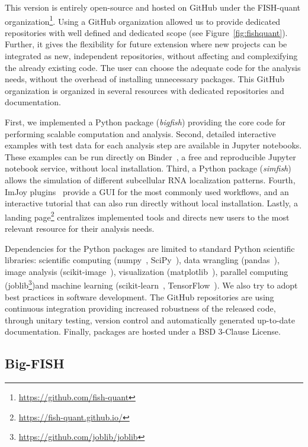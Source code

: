 This version is entirely open-source and hosted on GitHub under the FISH-quant organization\footnote{\url{https://github.com/fish-quant}}.
Using a GitHub organization allowed us to provide dedicated repositories with well defined and dedicated scope (see Figure~\ref{fig:fishquant}).
Further, it gives the flexibility for future extension where new projects can be integrated as new, independent repositories, without affecting and complexifying the already existing code.
The user can choose the adequate code for the analysis needs, without the overhead of installing unnecessary packages.
This GitHub organization is organized in several resources with dedicated repositories and documentation.

First, we implemented a Python package (\emph{bigfish}) providing the core code for performing scalable computation and analysis.
Second, detailed interactive examples with test data for each analysis step are available in Jupyter notebooks.
These examples can be run directly on Binder~\cite{Jupyter2018Binder2}, a free and reproducible Jupyter notebook service, without local installation.
Third, a Python package (\emph{simfish}) allows the simulation of different subcellular \ac{RNA} localization patterns.
Fourth, ImJoy plugins~\cite{ouyang_imjoy_2019} provide a \ac{GUI} for the most commonly used workflows, and an interactive tutorial that can also run directly without local installation.
Lastly, a landing page\footnote{\url{https://fish-quant.github.io/}} centralizes implemented tools and directs new users to the most relevant resource for their analysis needs.

Dependencies for the Python packages are limited to standard Python scientific libraries: scientific computing (numpy~\cite{2020NumPy}, SciPy~\cite{2020SciPy}), data wrangling (pandas~\cite{mckinney_pandas_2010}), image analysis (scikit-image~\cite{walt_scikit-image_2014}), visualization (matplotlib~\cite{hunter_matplotlib_2007}), parallel computing (joblib\footnote{\url{https://github.com/joblib/joblib}})and machine learning (scikit-learn~\cite{pedregosa11a_scikitlearn}, TensorFlow~\cite{tensorflow_2015}).
We also try to adopt best practices in software development.
The GitHub repositories are using continuous integration providing increased robustness of the released code, through unitary testing, version control and automatically generated up-to-date documentation.
Finally, packages are hosted under a BSD 3-Clause License.

\subsection{Big-FISH}
\label{subsec:bigfish}

